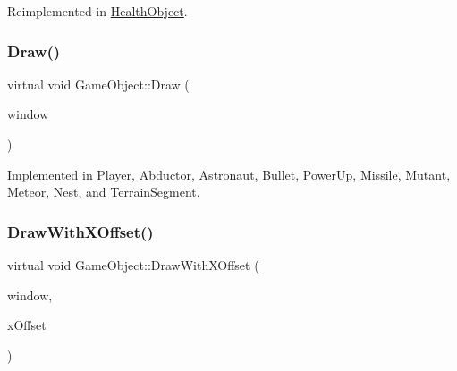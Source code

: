 Reimplemented in \hyperlink{class_health_object_a782acdc8ee8f50ce7e4a7b76b2b474be}{Health\+Object}.

\hypertarget{class_game_object_a0bd45eb831b3d0959eb498cad3e412ce}{}\label{class_game_object_a0bd45eb831b3d0959eb498cad3e412ce} 
\subsubsection{\texorpdfstring{Draw()}{Draw()}}
{\footnotesize\ttfamily virtual void Game\+Object\+::\+Draw (\begin{DoxyParamCaption}\item[{sf\+::\+Render\+Window \&}]{window }\end{DoxyParamCaption})\hspace{0.3cm}{\ttfamily [pure virtual]}}



Implemented in \hyperlink{class_player_acc9dd8e10a4e219e7ac78a822a7cde7b}{Player}, \hyperlink{class_abductor_ab27e1580f1a11d483d97f028deda7370}{Abductor}, \hyperlink{class_astronaut_ad87f989c99c64de938c367865cd196c4}{Astronaut}, \hyperlink{class_bullet_a44b861616d73fd5cd0fe78af2acda9c1}{Bullet}, \hyperlink{class_power_up_a0f52fe4ae4e6e47fa3fd4fb2bcc2dcb7}{Power\+Up}, \hyperlink{class_missile_ae80d48e796f506e03e632122f62ae230}{Missile}, \hyperlink{class_mutant_a024a5caac9b29a79a4a505d36cfd3122}{Mutant}, \hyperlink{class_meteor_a426244847c2446f36016c4b06713ce10}{Meteor}, \hyperlink{class_nest_a5d38f9e047947336dd2830e936ce2386}{Nest}, and \hyperlink{class_terrain_segment_a288c66908f5eaf7974424f64a95d9a9a}{Terrain\+Segment}.

\hypertarget{class_game_object_a8a3c07e92775fe00baa9e661fefb224e}{}\label{class_game_object_a8a3c07e92775fe00baa9e661fefb224e} 
\subsubsection{\texorpdfstring{Draw\+With\+X\+Offset()}{DrawWithXOffset()}}
{\footnotesize\ttfamily virtual void Game\+Object\+::\+Draw\+With\+X\+Offset (\begin{DoxyParamCaption}\item[{sf\+::\+Render\+Window \&}]{window,  }\item[{float}]{x\+Offset }\end{DoxyParamCaption})\hspace{0.3cm}{\ttfamily [pure virtual]}}



